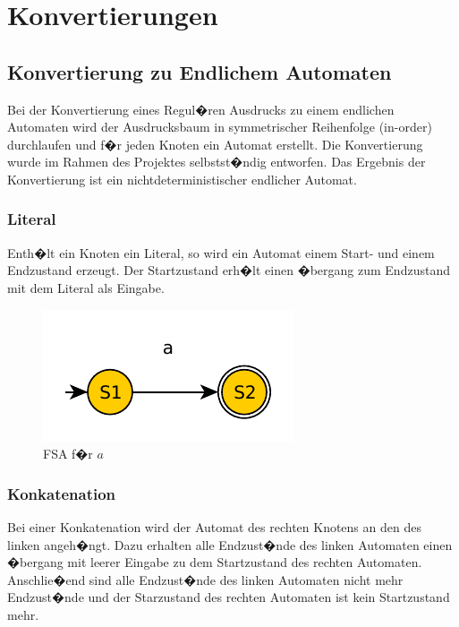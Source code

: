 \section{Konvertierungen}

\subsection{Konvertierung zu Endlichem Automaten}

Bei der Konvertierung eines Regul�ren Ausdrucks zu einem endlichen Automaten
wird der Ausdrucksbaum in symmetrischer Reihenfolge (in-order) durchlaufen und f�r
jeden Knoten ein Automat erstellt. Die Konvertierung wurde im Rahmen des
Projektes selbstst�ndig entworfen. Das Ergebnis der Konvertierung ist ein nichtdeterministischer
endlicher Automat.

\subsubsection{Literal}
Enth�lt ein Knoten ein Literal, so wird ein Automat
einem Start- und einem Endzustand erzeugt. Der
Startzustand erh�lt einen �bergang zum Endzustand
mit dem Literal als Eingabe.

\begin{figure}[h]
  \begin{center}
  \includegraphics{objectsToInclude/re_fsa_a.pdf}
  \caption{FSA f�r $a$}
  \label{fig:literal}
  \end{center}
\end{figure}

\subsubsection{Konkatenation}
Bei einer Konkatenation wird der Automat des
rechten Knotens an den des linken angeh�ngt.
Dazu erhalten alle Endzust�nde des linken
Automaten einen �bergang mit leerer Eingabe
zu dem Startzustand des rechten Automaten.
Anschlie�end sind alle Endzust�nde des linken
Automaten nicht mehr Endzust�nde und der
Starzustand des rechten Automaten ist kein
Startzustand mehr.

